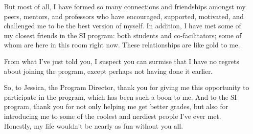 \documentclass{article}
\begin{document}
But most of all, I have formed so many connections and friendships amongst my
peers, mentors, and professors who have encouraged, supported,
motivated, and challenged me to be the best version of myself. In addition, I
have met some of my closest friends in the SI program: both students and
co-facilitators; some of whom are here in this room right now.  These
relationships are like gold to me.

From what I've just told you, I suspect you can surmise that I have no regrets
about joining the program, except perhaps not having done it earlier.

So, to Jessica, the Program Director, thank you for giving me this opportunity
to participate in the program, which has been such a boon to me. And to the SI
program, thank you for not only helping me get better grades, but also
for introducing me to some of the coolest and nerdiest people I've ever met.
Honestly, my life wouldn't be nearly as fun without you all.
\end{document}
